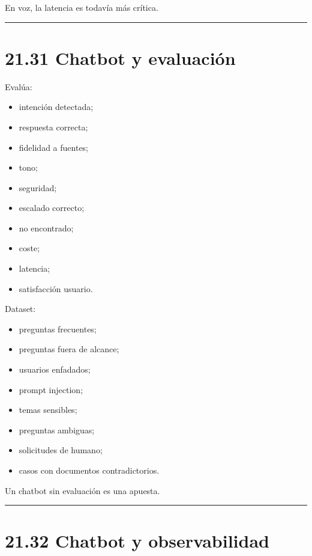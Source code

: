 En voz, la latencia es todavía más crítica.

\begin{center}\rule{0.5\linewidth}{0.5pt}\end{center}

\section{21.31 Chatbot y evaluación}\label{chatbot-y-evaluaciuxf3n}

Evalúa:

\begin{itemize}
\tightlist
\item
  intención detectada;
\item
  respuesta correcta;
\item
  fidelidad a fuentes;
\item
  tono;
\item
  seguridad;
\item
  escalado correcto;
\item
  no encontrado;
\item
  coste;
\item
  latencia;
\item
  satisfacción usuario.
\end{itemize}

Dataset:

\begin{itemize}
\tightlist
\item
  preguntas frecuentes;
\item
  preguntas fuera de alcance;
\item
  usuarios enfadados;
\item
  prompt injection;
\item
  temas sensibles;
\item
  preguntas ambiguas;
\item
  solicitudes de humano;
\item
  casos con documentos contradictorios.
\end{itemize}

Un chatbot sin evaluación es una apuesta.

\begin{center}\rule{0.5\linewidth}{0.5pt}\end{center}

\section{21.32 Chatbot y observabilidad}\label{chatbot-y-observabilidad}

